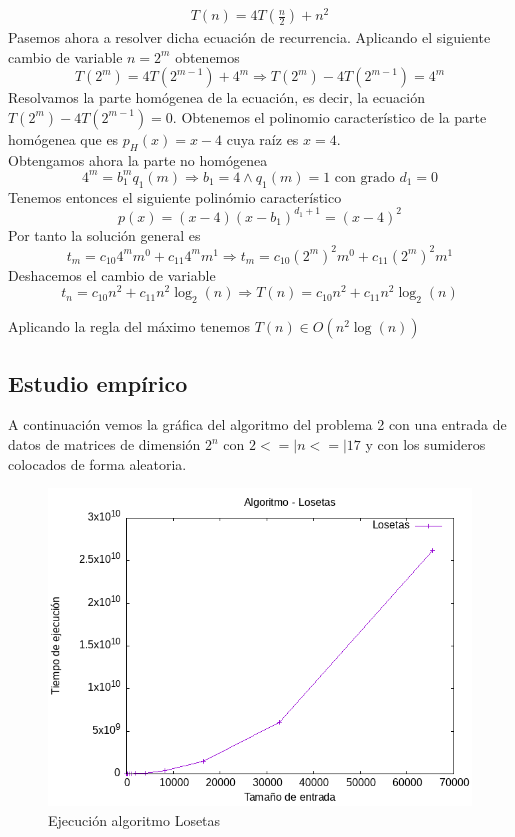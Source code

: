 \documentclass[11pt,openany]{book}
\begin{document}
\begin{gather*}
      T(n)= 4T(\frac{n}{2})+n^2
\end{gather*}
Pasemos ahora a resolver dicha ecuación de recurrencia. Aplicando el siguiente cambio de variable $n=2^m$ obtenemos
\begin{equation*}
      T(2^m)=4T(2^{m-1})+4^m \Rightarrow T(2^m)-4T(2^{m-1})=4^m
\end{equation*}
Resolvamos la parte homógenea de la ecuación, es decir, la ecuación $T(2^m)-4T(2^{m-1})=0$. Obtenemos el polinomio
característico de la parte homógenea que es $p_H(x)=x-4$ cuya raíz es $x=4$. \\
Obtengamos ahora la parte no homógenea
\begin{equation*}
      4^m=b_1^m q_1(m) \Rightarrow b_1=4 \wedge q_1(m)=1 \text{ con grado } d_1=0
\end{equation*}
Tenemos entonces el siguiente polinómio característico
\begin{equation*}
      p(x)=(x-4)(x-b_1)^{d_1+1}=(x-4)^2
\end{equation*}
Por tanto la solución general es
\begin{equation*}
      t_m=c_{10}4^mm^0+c_{11}4^mm^1  {\Rightarrow}  t_m=c_{10}(2^{m})^2m^0+c_{11}(2^{m})^2m^1
\end{equation*}
Deshacemos el cambio de variable
\begin{equation*}
      t_n=c_{10}n^2+c_{11}n^2\log_2(n) \Rightarrow T(n)=c_{10}n^2+c_{11}n^2\log_2(n)
\end{equation*}

Aplicando la regla del máximo tenemos $T(n) \in O(n^2\log(n))$
\subsection{Estudio empírico}

A continuación  vemos la gráfica del algoritmo del problema 2 con una entrada de datos de matrices de dimensión $2^n$ con $2<=|n<=|17$ y con
los sumideros colocados de forma aleatoria.
\begin{center}
      \begin{figure}[H]
            \centering
            \includegraphics[width=0.7\linewidth]{assets/Img/Losetas.png}
            \caption{Ejecución algoritmo Losetas}
            \label{fig:Viajante}
      \end{figure}
\end{center}
\end{document}
